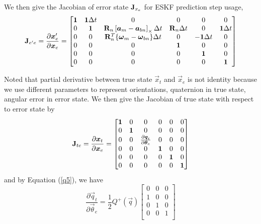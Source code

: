 We then give the Jacobian of error state $\mathbf{J}_{x_e}$ for ESKF prediction step usage,
\begin{equation}\label{f14}
	\mathbf{J}_{e^\prime e} = \frac{\partial{\boldsymbol{x}_e^{\prime}}}{\partial{\boldsymbol{x}_e }} = \begin{bmatrix}
	\mathbf{1} & \mathbf{1}\Delta{t} & 0 & 0 & 0 & 0 \\
	0 & \mathbf{1} & \mathbf{R}_n \left[ \boldsymbol{a}_m - \boldsymbol{a}_{bn} \right]_{\times}\Delta{t} & \mathbf{R}_n\Delta{t} & 0 & \mathbf{1}\Delta{t} \\
	0 & 0 & \mathbf{R}_n^T \{ \boldsymbol{\omega}_m - \boldsymbol{\omega}_{bn} \}\Delta{t} & 0 & -\mathbf{1}\Delta{t} & 0 \\
	0 & 0 & 0 & \mathbf{1} & 0 & 0 \\
	0 & 0 & 0 & 0 & \mathbf{1} & 0 \\
	0 & 0 & 0 & 0 & 0 & \mathbf{1} \\
	\end{bmatrix}
\end{equation}

Noted that partial derivative between true state $\vec{x}_t$ and $\vec{x}_e$ is not identity because we use different parameters to represent orientations, \eg quaternion in true state, angular error in error state. We then give the Jacobian of true state with respect to error state by
\begin{equation}\label{f15}
	\mathbf{J}_{t e} = \frac{\partial{\boldsymbol{x}_t}}{\partial{\boldsymbol{x}_e }} = \begin{bmatrix}
	\mathbf{1} & 0 & 0 & 0 & 0 & 0 \\
	0 & \mathbf{1} &0 & 0 & 0 & 0 \\
	0 & 0 & \frac{\partial{\boldsymbol{q}_t}}{\partial{\boldsymbol{\theta}_e }} & 0 & 0 & 0 \\
	0 & 0 & 0 & \mathbf{1} & 0 & 0 \\
	0 & 0 & 0 & 0 & \mathbf{1} & 0 \\
	0 & 0 & 0 & 0 & 0 & \mathbf{1} \\
	\end{bmatrix}
\end{equation}
and by Equation (\ref{q5}), we have
\begin{equation}\label{f16}
	\frac{\partial{\vec{q}_t}}{\partial{\vec{\theta}_e }} = \frac{1}{2}Q^+(\vec{q})\begin{bmatrix}
	0 & 0 & 0 \\
	1 & 0 & 0 \\
	0 & 1 & 0 \\
	0 & 0 & 1 \\
	\end{bmatrix}
\end{equation}

